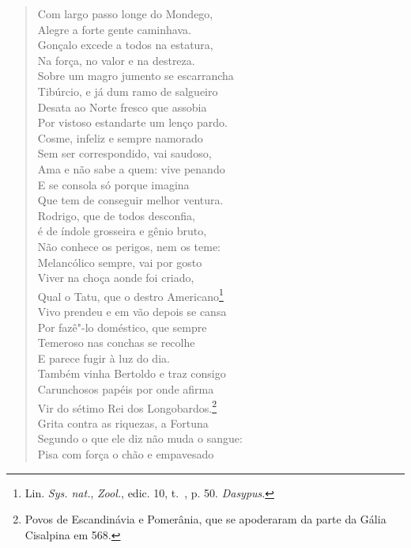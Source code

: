 \begin{verse}

Com largo passo longe do Mondego,\\			\index{\Monde}
Alegre a forte gente caminhava.\\
Gonçalo excede a todos na estatura,\\
Na força, no valor e na destreza.\\
Sobre um magro jumento se escarrancha\\
Tibúrcio, e já dum ramo de salgueiro\\
Desata ao Norte fresco que assobia\\
Por vistoso estandarte um lenço pardo.\\ 
Cosme, infeliz e sempre namorado\\
Sem ser correspondido, vai saudoso,\\
Ama e não sabe a quem: vive penando\\
E se consola só porque imagina\\
Que tem de conseguir melhor ventura.\\ 
Rodrigo, que de todos desconfia,\\
é de índole grosseira e gênio bruto,\\
Não conhece os perigos, nem os teme:\\
Melancólico sempre, vai por gosto\\			\index{\Melanc}
Viver na choça aonde foi criado,\\ 		\index{\Choca}
Qual o Tatu, que o destro Americano\footnote{ Lin. \textit{Sys. nat.}, \textit{Zool.}, edic. 10, t.~, p. 50. \textit{Dasypus}.}\\
Vivo prendeu e em vão depois se cansa\\
Por fazê"-lo doméstico, que sempre\\
Temeroso nas conchas se recolhe\\
E parece fugir à luz do dia.\\ 
Também vinha Bertoldo e traz consigo\\
Carunchosos papéis por onde afirma\\
Vir do sétimo Rei dos Longobardos.\footnote{ Povos de Escandinávia e Pomerânia, que se apoderaram 
da parte da Gália Cisalpina em 568.}\\		\index{\Galia}	\index{\Longob}
Grita contra as riquezas, a Fortuna\\		\index{\Fortu}
Segundo o que ele diz não muda o sangue:\\
Pisa com força o chão e empavesado\\			\index{\Empav}

\end{verse}
